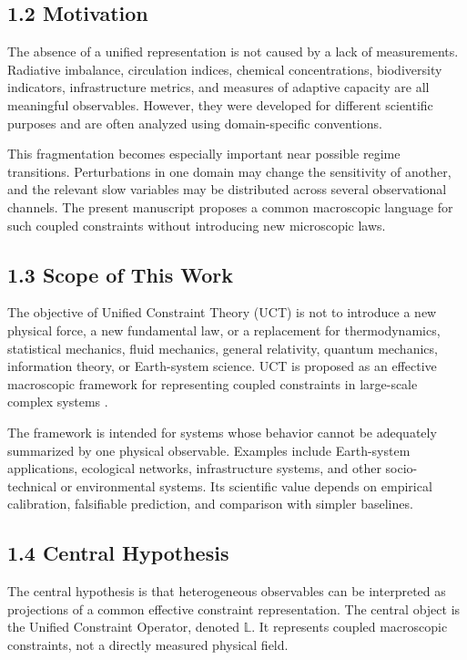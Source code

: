 \documentclass[aps,pre,reprint,superscriptaddress,nofootinbib]{revtex4-2}
\begin{document}
\subsection{1.2 Motivation}

The absence of a unified representation is not caused by a lack of measurements. Radiative imbalance, circulation indices, chemical concentrations, biodiversity indicators, infrastructure metrics, and measures of adaptive capacity are all meaningful observables. However, they were developed for different scientific purposes and are often analyzed using domain-specific conventions.

This fragmentation becomes especially important near possible regime transitions. Perturbations in one domain may change the sensitivity of another, and the relevant slow variables may be distributed across several observational channels. The present manuscript proposes a common macroscopic language for such coupled constraints without introducing new microscopic laws.

\subsection{1.3 Scope of This Work}

The objective of Unified Constraint Theory (UCT) is not to introduce a new physical force, a new fundamental law, or a replacement for thermodynamics, statistical mechanics, fluid mechanics, general relativity, quantum mechanics, information theory, or Earth-system science. UCT is proposed as an effective macroscopic framework \cite{Wilson1983RG,Goldenfeld1992} for representing coupled constraints in large-scale complex systems \cite{Mitchell2009,Barabasi2016}.

The framework is intended for systems whose behavior cannot be adequately summarized by one physical observable. Examples include Earth-system applications, ecological networks, infrastructure systems, and other socio-technical or environmental systems. Its scientific value depends on empirical calibration, falsifiable prediction, and comparison with simpler baselines.

\subsection{1.4 Central Hypothesis}

The central hypothesis is that heterogeneous observables can be interpreted as projections of a common effective constraint representation. The central object is the Unified Constraint Operator, denoted \(\mathbb{L}\). It represents coupled macroscopic constraints, not a directly measured physical field.
\end{document}
